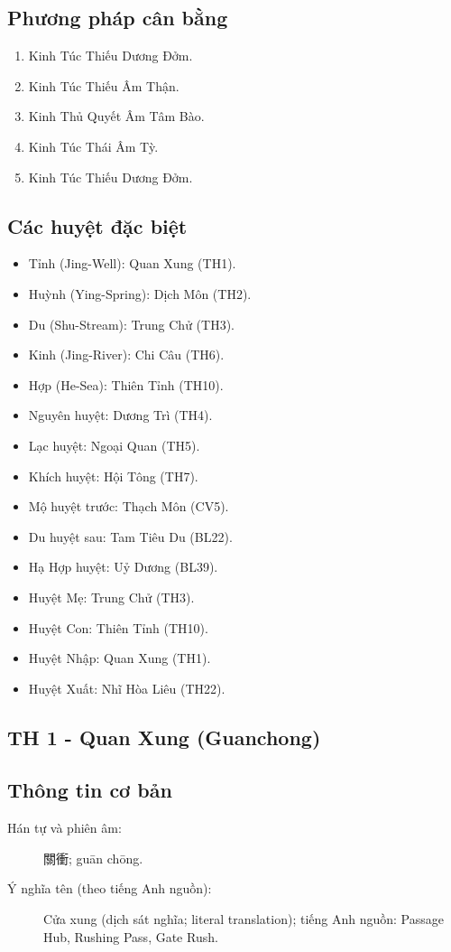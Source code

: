 \documentclass[12pt,a4paper]{article}
\begin{document}
\subsection*{Phương pháp cân bằng}
\begin{enumerate}
\item Kinh Túc Thiếu Dương Đởm.
\item Kinh Túc Thiếu Âm Thận.
\item Kinh Thủ Quyết Âm Tâm Bào.
\item Kinh Túc Thái Âm Tỳ.
\item Kinh Túc Thiếu Dương Đởm.
\end{enumerate}
\subsection*{Các huyệt đặc biệt}
\begin{itemize}
\item Tỉnh (Jing-Well): Quan Xung (TH1).
\item Huỳnh (Ying-Spring): Dịch Môn (TH2).
\item Du (Shu-Stream): Trung Chử (TH3).
\item Kinh (Jing-River): Chi Câu (TH6).
\item Hợp (He-Sea): Thiên Tỉnh (TH10).
\item Nguyên huyệt: Dương Trì (TH4).
\item Lạc huyệt: Ngoại Quan (TH5).
\item Khích huyệt: Hội Tông (TH7).
\item Mộ huyệt trước: Thạch Môn (CV5).
\item Du huyệt sau: Tam Tiêu Du (BL22).
\item Hạ Hợp huyệt: Uỷ Dương (BL39).
\item Huyệt Mẹ: Trung Chử (TH3).
\item Huyệt Con: Thiên Tỉnh (TH10).
\item Huyệt Nhập: Quan Xung (TH1).
\item Huyệt Xuất: Nhĩ Hòa Liêu (TH22).
\end{itemize}
\subsection{TH 1 - Quan Xung (Guanchong)}
\subsection*{Thông tin cơ bản}\begin{description}\item[Hán tự và phiên âm:] 關衝; guān chōng.\item[Ý nghĩa tên (theo tiếng Anh nguồn):] Cửa xung (dịch sát nghĩa; literal translation); tiếng Anh nguồn: Passage Hub, Rushing Pass, Gate Rush.\end{description}
\end{document}
